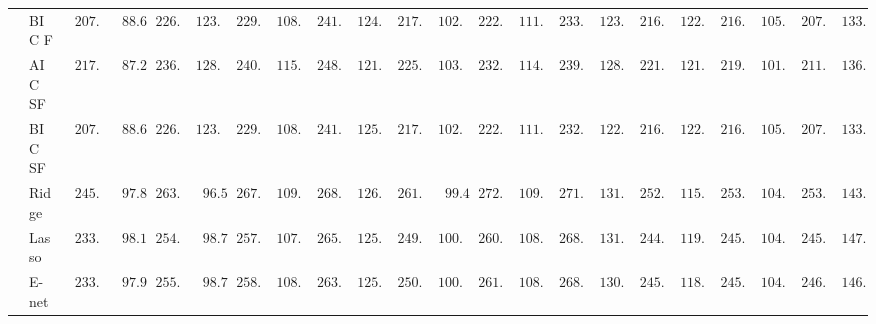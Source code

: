 \begin{tabular}{p{0.2cm}p{1cm}|p{0.6cm}p{0.6cm}|p{0.6cm}p{0.6cm}p{0.6cm}p{0.6cm}p{0.6cm}p{0.6cm}|p{0.6cm}p{0.6cm}p{0.6cm}p{0.6cm}p{0.6cm}p{0.6cm}|p{0.6cm}p{0.6cm}p{0.6cm}p{0.6cm}p{0.6cm}p{0.6cm}}
 & BIC F  & $\phantom{0}207.16$ & $\phantom{00}88.60$ & $\phantom{0}226.96$ & $\phantom{0}123.79$ & $\phantom{0}229.62$ & $\phantom{0}108.81$ & $\phantom{0}241.47$ & $\phantom{0}124.63$ & $\phantom{0}217.90$ & $\phantom{0}102.35$ & $\phantom{0}222.37$ & $\phantom{0}111.19$ & $\phantom{0}233.24$ & $\phantom{0}123.24$ & $\phantom{0}216.38$ & $\phantom{0}122.48$ & $\phantom{0}216.11$ & $\phantom{0}105.02$ & $\phantom{0}207.64$ & $\phantom{0}133.44$ \\
 & AIC SF  & $\phantom{0}217.01$ & $\phantom{00}87.28$ & $\phantom{0}236.19$ & $\phantom{0}128.24$ & $\phantom{0}240.74$ & $\phantom{0}115.43$ & $\phantom{0}248.23$ & $\phantom{0}121.92$ & $\phantom{0}225.16$ & $\phantom{0}103.06$ & $\phantom{0}232.05$ & $\phantom{0}114.12$ & $\phantom{0}239.37$ & $\phantom{0}128.12$ & $\phantom{0}221.35$ & $\phantom{0}121.43$ & $\phantom{0}219.46$ & $\phantom{0}101.61$ & $\phantom{0}211.75$ & $\phantom{0}136.73$ \\
 & BIC SF  & $\phantom{0}207.16$ & $\phantom{00}88.60$ & $\phantom{0}226.96$ & $\phantom{0}123.79$ & $\phantom{0}229.43$ & $\phantom{0}108.87$ & $\phantom{0}241.92$ & $\phantom{0}125.01$ & $\phantom{0}217.90$ & $\phantom{0}102.35$ & $\phantom{0}222.37$ & $\phantom{0}111.19$ & $\phantom{0}232.90$ & $\phantom{0}122.30$ & $\phantom{0}216.38$ & $\phantom{0}122.48$ & $\phantom{0}216.17$ & $\phantom{0}105.06$ & $\phantom{0}207.47$ & $\phantom{0}133.17$ \\
 & Ridge  & $\phantom{0}245.43$ & $\phantom{00}97.85$ & $\phantom{0}263.87$ & $\phantom{00}96.53$ & $\phantom{0}267.83$ & $\phantom{0}109.80$ & $\phantom{0}268.99$ & $\phantom{0}126.97$ & $\phantom{0}261.83$ & $\phantom{00}99.45$ & $\phantom{0}272.21$ & $\phantom{0}109.03$ & $\phantom{0}271.32$ & $\phantom{0}131.05$ & $\phantom{0}252.87$ & $\phantom{0}115.49$ & $\phantom{0}253.48$ & $\phantom{0}104.03$ & $\phantom{0}253.56$ & $\phantom{0}143.72$ \\
 & Lasso  & $\phantom{0}233.09$ & $\phantom{00}98.14$ & $\phantom{0}254.55$ & $\phantom{00}98.78$ & $\phantom{0}257.59$ & $\phantom{0}107.75$ & $\phantom{0}265.26$ & $\phantom{0}125.43$ & $\phantom{0}249.84$ & $\phantom{0}100.77$ & $\phantom{0}260.54$ & $\phantom{0}108.73$ & $\phantom{0}268.59$ & $\phantom{0}131.10$ & $\phantom{0}244.57$ & $\phantom{0}119.74$ & $\phantom{0}245.45$ & $\phantom{0}104.33$ & $\phantom{0}245.98$ & $\phantom{0}147.18$ \\
 & E-net  & $\phantom{0}233.79$ & $\phantom{00}97.92$ & $\phantom{0}255.01$ & $\phantom{00}98.72$ & $\phantom{0}258.97$ & $\phantom{0}108.30$ & $\phantom{0}263.87$ & $\phantom{0}125.10$ & $\phantom{0}250.86$ & $\phantom{0}100.42$ & $\phantom{0}261.23$ & $\phantom{0}108.73$ & $\phantom{0}268.62$ & $\phantom{0}130.77$ & $\phantom{0}245.16$ & $\phantom{0}118.43$ & $\phantom{0}245.80$ & $\phantom{0}104.02$ & $\phantom{0}246.44$ & $\phantom{0}146.49$ \\

\end{tabular}
